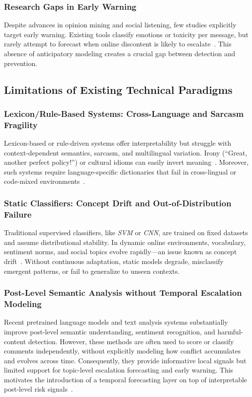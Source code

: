 \documentclass[journal]{IEEEtran}
\begin{document}
\subsubsection{Research Gaps in Early Warning}
Despite advances in opinion mining and social listening, few studies explicitly target early warning. Existing tools classify emotions or toxicity per message, but rarely attempt to forecast when online discontent is likely to escalate~\cite{Wang2020}. This absence of anticipatory modeling creates a crucial gap between detection and prevention.

\subsection{Limitations of Existing Technical Paradigms}

\subsubsection{Lexicon/Rule-Based Systems: Cross-Language and Sarcasm Fragility}
Lexicon-based or rule-driven systems offer interpretability but struggle with context-dependent semantics, sarcasm, and multilingual variation. Irony (“Great, another perfect policy!”) or cultural idioms can easily invert meaning~\cite{Dhumpati2025}. Moreover, such systems require language-specific dictionaries that fail in cross-lingual or code-mixed environments~\cite{Kaity2020}.

\subsubsection{Static Classifiers: Concept Drift and Out-of-Distribution Failure}
Traditional supervised classifiers, like \emph{SVM} or \emph{CNN}, are trained on fixed datasets and assume distributional stability. In dynamic online environments, vocabulary, sentiment norms, and social topics evolve rapidly—an issue known as concept drift~\cite{Gama2014}. Without continuous adaptation, static models degrade, misclassify emergent patterns, or fail to generalize to unseen contexts.

\subsubsection{Post-Level Semantic Analysis without Temporal Escalation Modeling}
Recent pretrained language models and text analysis systems substantially improve post-level semantic understanding, sentiment recognition, and harmful-content detection. However, these methods are often used to score or classify comments independently, without explicitly modeling how conflict accumulates and evolves across time. Consequently, they provide informative local signals but limited support for topic-level escalation forecasting and early warning. This motivates the introduction of a temporal forecasting layer on top of interpretable post-level risk signals~\cite{Abdalgader2025}.
\end{document}
